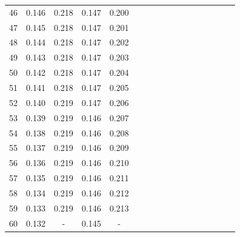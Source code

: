 \documentclass{report}
\begin{document}
\begin{appendices}
\begin{table}
\begin{tabular}{|c|cccc|cccc|cccc|cccc|}
46 & 0.146 & 0.218 & 0.147 & 0.200 & & & & & & & & & & & &\\
47 & 0.145 & 0.218 & 0.147 & 0.201 & & & & & & & & & & & &\\
48 & 0.144 & 0.218 & 0.147 & 0.202 & & & & & & & & & & & &\\
49 & 0.143 & 0.218 & 0.147 & 0.203 & & & & & & & & & & & &\\
50 & 0.142 & 0.218 & 0.147 & 0.204 & & & & & & & & & & & &\\
51 & 0.141 & 0.218 & 0.147 & 0.205 & & & & & & & & & & & &\\
52 & 0.140 & 0.219 & 0.147 & 0.206 & & & & & & & & & & & &\\
53 & 0.139 & 0.219 & 0.146 & 0.207 & & & & & & & & & & & &\\
54 & 0.138 & 0.219 & 0.146 & 0.208 & & & & & & & & & & & &\\
55 & 0.137 & 0.219 & 0.146 & 0.209 & & & & & & & & & & & &\\
56 & 0.136 & 0.219 & 0.146 & 0.210 & & & & & & & & & & & &\\
57 & 0.135 & 0.219 & 0.146 & 0.211 & & & & & & & & & & & &\\
58 & 0.134 & 0.219 & 0.146 & 0.212 & & & & & & & & & & & &\\
59 & 0.133 & 0.219 & 0.146 & 0.213 & & & & & & & & & & & &\\
60 & 0.132 &   -   & 0.145 &   -   & & & & & & & & & & & &\\
\hline
\end{tabular}
\end{table}


\end{appendices}
\end{document}
